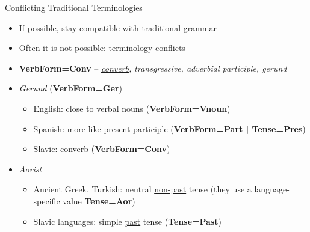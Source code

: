 \documentclass[10pt, compress, aspectratio=169]{beamer}
\newcommand{\feat}[1]{\textbf{\footnotesize\color{red}#1}}
\begin{document}
\begin{frame}{Conflicting Traditional Terminologies}
\begin{itemize}
\item If possible, stay compatible with traditional grammar
\item Often it is not possible: terminology conflicts
\item \textbf{\feat{VerbForm=Conv}} -- \textit{\underline{converb}, transgressive, adverbial participle, gerund}
\item<2-> \textit{Gerund} (\feat{VerbForm=Ger})
  \begin{itemize}
  \item English: close to verbal nouns (\textbf{\feat{VerbForm=Vnoun}})
  \item Spanish:
  more like present participle (\textbf{\feat{VerbForm=Part | Tense=Pres}})
  \item Slavic: converb (\textbf{\feat{VerbForm=Conv}})
  \end{itemize}
\item<3-> \textit{Aorist}
  \begin{itemize}
  \item Ancient Greek, Turkish: neutral \underline{non-past} tense (they use a language-specific value \feat{Tense=Aor})
  \item Slavic languages: simple \underline{past} tense (\textbf{\feat{Tense=Past}})
  \end{itemize}
\end{itemize}
\end{frame}
\end{document}
